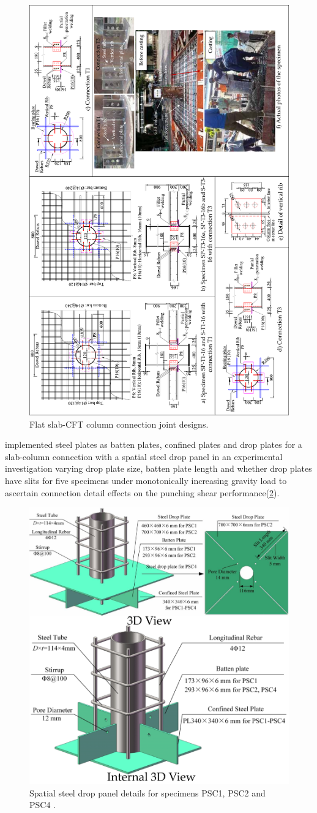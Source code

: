 \begin{figure}\centering
    \includegraphics[height=\textwidth,angle=-90]{Figures/l2022f2.pdf}
    \caption{Flat slab-CFT column connection joint designs\citep{luu2022}.}
    \label{l2022f2}
    \end{figure}
\cite{chen2023} implemented steel plates as batten plates, confined plates and drop plates for a slab-column connection with a spatial steel drop panel in an experimental investigation varying drop plate size, batten plate length and whether drop plates have slits for five specimens under monotonically increasing gravity load to ascertain connection detail effects on the punching shear performance(\ref{c2023f2}).
\begin{figure}\centering
    \includegraphics[height=\columnwidth]{Figures/c2023f2.pdf}
    \caption{Spatial steel drop panel details for specimens PSC1, PSC2 and PSC4 \citep{chen2023}.}
    \label{c2023f2}
    \end{figure} 
